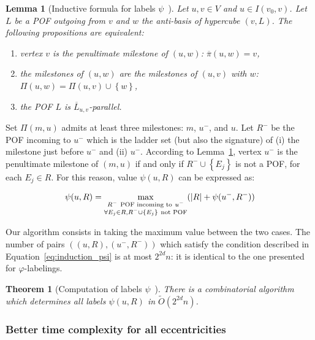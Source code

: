 \documentclass{article}
\newtheorem{theorem}{Theorem}
\newtheorem{lemma}{Lemma}
\newcommand{\set}[1]{\left\{ #1 \right\}}
\newcommand{\card}[1]{\left| #1 \right|}
\begin{document}
\begin{lemma}[Inductive formula for labels $\psi$~\cite{BeHa21}]
Let $u,v \in V$ and $u \in I(v_0,v)$. Let $L$ be a POF outgoing from $v$ and $w$ the anti-basis of hypercube $(v,L)$. The following propositions are equivalent:
\begin{enumerate}
\item[(i)] vertex $v$ is the penultimate milestone of $(u,w)$: $\overline{\pi}(u,w) = v$,
\item[(ii)] the milestones of $(u,w)$ are the milestones of $(u,v)$ with $w$: $\Pi(u,w) = \Pi(u,v) \cup \set{w}$,
\item[(iii)] the POF $L$ is $\overline{L}_{u,v}$-parallel.
\end{enumerate}
\label{le:penultimate}
\end{lemma}

Set $\Pi(m,u)$ admits at least three milestones: $m$, $u^-$, and $u$. Let $R^-$ be the POF incoming to $u^-$ which is the ladder set (but also the signature) of (i) the milestone just before $u^-$ and (ii) $u^-$. According to Lemma~\ref{le:penultimate}, vertex $u^-$ is the penultimate milestone of $(m,u)$ if and only if $R^- \cup \set{E_j}$ is not a POF, for each $E_j \in R$. For this reason, value $\psi(u,R)$ can be expressed as:

\begin{equation}
\psi(u,R) = \max\limits_{\substack{R^- ~\mbox{\scriptsize{POF incoming to}}~ u^- \\ \forall E_j \in R, R^- \cup \set{E_j} ~\mbox{\scriptsize{not POF}}}} (\card{R} + \psi(u^-,R^-))
\label{eq:induction_psi}
\end{equation}

Our algorithm consists in taking the maximum value between the two cases. The number of pairs $((u,R),(u^-,R^-))$ which satisfy the condition described in Equation~\eqref{eq:induction_psi} is at most $2^{2d}n$: it is identical to the one presented for $\varphi$-labelings.

\begin{theorem}[Computation of labels $\psi$~\cite{BeHa21}]
There is a combinatorial algorithm which determines all labels $\psi(u,R)$ in $\tilde{O}(2^{2d}n)$. 
\label{th:compute_psi}
\end{theorem}

\subsubsection{Better time complexity for all eccentricities} \label{subsubsec:ecc}
\end{document}
